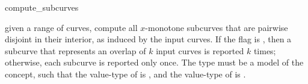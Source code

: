 \ccRefPageBegin

\begin{ccRefFunction}{compute_subcurves}


{given a range of curves, compute all $x$-monotone subcurves that are pairwise
 disjoint in their interior, as induced by the input curves.
 If the flag  is , then a subcurve that
 represents an overlap of $k$ input curves is reported $k$ times; otherwise,
 each subcurve is reported only once. The  type must be a model
 of the  concept, such that the value-type of
  is , and the value-type of
  is .}

\end{ccRefFunction}

\ccRefPageEnd

